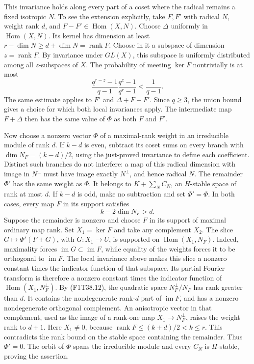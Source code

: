 This invariance holds along every part of a coset where
the radical remains a fixed isotropic \(N\). To see the
extension explicitly, take \(F,F'\) with radical \(N\),
weight rank \(d\), and \(F-F'\in\operatorname{Hom}(X,N)\).
Choose \(\Delta\) uniformly in \(\operatorname{Hom}(X,N)\).
Its kernel has dimension at least
\(r-\dim N\ge d+\dim N=\operatorname{rank}F\).
Choose in it a subspace of dimension \(z=\operatorname{rank}F\).
By invariance under \(GL(X)\), this subspace is uniformly
distributed among all \(z\)-subspaces of \(X\).
The probability of meeting \(\ker F\) nontrivially is at
most
\[
 \frac{q^{r-z}-1}{q-1}\frac{q^z-1}{q^r-1}
                         <\frac1{q-1}.
 \tag{F1T38.11}
\]
The same estimate applies to \(F'\) and
\(\Delta+F-F'\). Since \(q\ge3\), the union bound gives
a choice for which both local invariances apply.
The intermediate map \(F+\Delta\) then has the same
value of \(\Phi\) as both \(F\) and \(F'\).

Now choose a nonzero vector \(\Phi\) of a maximal-rank
weight in an irreducible module of rank \(d\). If
\(k-d\) is even, subtract its coset sums on every branch
with \(\dim N_F=(k-d)/2\), using the just-proved
invariance to define each coefficient. Distinct such
branches do not interfere: a map of this radical
dimension with image in \(N^\perp\) must have image
exactly \(N^\perp\), and hence radical \(N\).
The remainder \(\Phi'\) has the same weight as \(\Phi\).
It belongs to \(K+\sum_N C_N\), an \(H\)-stable space
of rank at most \(d\). If \(k-d\) is odd, make no
subtraction and set \(\Phi'=\Phi\). In both cases, every
map \(F\) in its support satisfies
\[
                         k-2\dim N_F>d.
 \tag{F1T38.12}
\]
Suppose the remainder is nonzero and choose \(F\) in
its support of maximal ordinary map rank. Set
\(X_1=\ker F\) and take any complement \(X_2\).
The slice \(G\mapsto\Phi'(F+G)\), with
\(G:X_1\to U\), is supported on
\(\operatorname{Hom}(X_1,N_F)\). Indeed, maximality
forces \(\operatorname{im}G\subset\operatorname{im}F\),
while equality of the weights forces it to be
orthogonal to \(\operatorname{im}F\). The local invariance
above makes this slice a nonzero constant times the
indicator function of that subspace. Its partial Fourier
transform is therefore a nonzero constant times the
indicator function of \(\operatorname{Hom}(X_1,N_F^\perp)\).
By (F1T38.12), the quadratic space \(N_F^\perp/N_F\)
has rank greater than \(d\). It contains the nondegenerate
rank-\(d\) part of \(\operatorname{im}F\), and has a
nonzero nondegenerate orthogonal complement. An
anisotropic vector in that complement, used as the image
of a rank-one map \(X_1\to N_F^\perp\), raises the
weight rank to \(d+1\). Here \(X_1\ne0\), because
\(\operatorname{rank}F\le(k+d)/2<k\le r\).
This contradicts the rank bound on the stable space
containing the remainder. Thus \(\Phi'=0\).
The orbit of \(\Phi\) spans the irreducible module and
every \(C_N\) is \(H\)-stable, proving the assertion.

